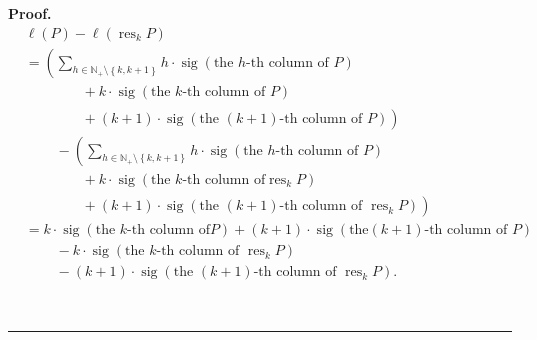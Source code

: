 \documentclass[numbers=enddot,12pt,final,onecolumn,notitlepage]{scrartcl}%
\theoremstyle{definition}
\newenvironment{proof}[1][Proof]{\noindent\textbf{#1.} }{\ \rule{0.5em}{0.5em}}
\newenvironment{verlong}{}{}
\let\sumnonlimits\sum
\renewcommand{\sum}{\sumnonlimits\limits}
\begin{document}
\begin{verlong}
\begin{proof}
\begin{align}
&  \ell\left(  P\right)  -\ell\left(  \operatorname*{res}\nolimits_{k}P\right)
\nonumber\\
&  =\left(  \sum_{h\in\mathbb{N}_{+}\setminus\left\{  k,k+1\right\}  }%
h\cdot\operatorname*{sig}\left(  \text{the }h\text{-th column of }P\right)
\right. \nonumber\\
&  \ \ \ \ \ \ \ \ \ \ \left.
\phantom{\sum_{h}}%
+k\cdot\operatorname*{sig}\left(  \text{the }k\text{-th column of }P\right)
\right. \nonumber\\
&  \ \ \ \ \ \ \ \ \ \ \left.
\phantom{\sum_{h}}%
+\left(  k+1\right)  \cdot\operatorname*{sig}\left(  \text{the }\left(
k+1\right)  \text{-th column of }P\right)  \right) \nonumber\\
&  \ \ \ \ \ \ \ \ \ \ -\left(  \sum_{h\in\mathbb{N}_{+}\setminus\left\{
k,k+1\right\}  }h\cdot\operatorname*{sig}\left(  \text{the }h\text{-th column
of }P\right)  \right. \nonumber\\
&  \ \ \ \ \ \ \ \ \ \ \left.
\phantom{\sum_{h}}%
+k\cdot\operatorname*{sig}\left(  \text{the }k\text{-th column of
}\operatorname*{res}\nolimits_{k}P\right)  \right. \nonumber\\
&  \ \ \ \ \ \ \ \ \ \ \left.
\phantom{\sum_{h}}%
+\left(  k+1\right)  \cdot\operatorname*{sig}\left(  \text{the }\left(
k+1\right)  \text{-th column of }\operatorname*{res}\nolimits_{k}P\right)
\right) \nonumber\\
&  =k\cdot\operatorname*{sig}\left(  \text{the }k\text{-th column of
}P\right)  +\left(  k+1\right)  \cdot\operatorname*{sig}\left(  \text{the
}\left(  k+1\right)  \text{-th column of }P\right) \nonumber\\
&  \ \ \ \ \ \ \ \ \ \ -k\cdot\operatorname*{sig}\left(  \text{the }k\text{-th
column of }\operatorname*{res}\nolimits_{k}P\right) \nonumber\\
&  \ \ \ \ \ \ \ \ \ \ -\left(  k+1\right)  \cdot\operatorname*{sig}\left(
\text{the }\left(  k+1\right)  \text{-th column of }\operatorname*{res}%
\nolimits_{k}P\right)  . \label{pf.lem.BK.res.lendec.pf.3}%
\end{align}



\end{proof}
\end{verlong}
\end{document}
